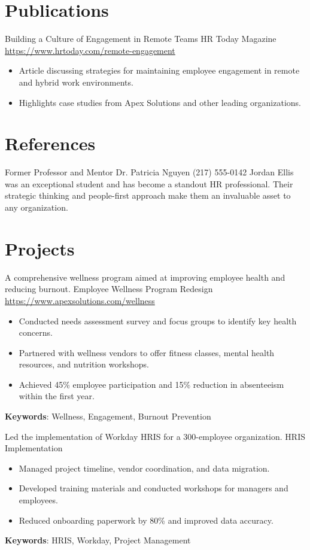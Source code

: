 \documentclass[a4paper, serif, 10pt]{moderncv}
\begin{document}
\section{Publications}

        {Building a Culture of Engagement in Remote Teams}
        {HR Today Magazine}
        {\url{https://www.hrtoday.com/remote-engagement}}
        {}
        {\begin{itemize}
\item Article discussing strategies for maintaining employee engagement in remote and hybrid work environments.
\item Highlights case studies from Apex Solutions and other leading organizations.
\end{itemize}}
\section{References}

        {Former Professor and Mentor}
        {Dr. Patricia Nguyen}
        {(217) 555-0142}
        {}
        {Jordan Ellis was an exceptional student and has become a standout HR professional. Their strategic thinking and people-first approach make them an invaluable asset to any organization.}
\section{Projects}

        {A comprehensive wellness program aimed at improving employee health and reducing burnout.}
        {Employee Wellness Program Redesign}
        {\url{https://www.apexsolutions.com/wellness}}
        {}
        {\begin{itemize}
\item Conducted needs assessment survey and focus groups to identify key health concerns.
\item Partnered with wellness vendors to offer fitness classes, mental health resources, and nutrition workshops.
\item Achieved 45\% employee participation and 15\% reduction in absenteeism within the first year.
\end{itemize}
\textbf{Keywords}: Wellness, Engagement, Burnout Prevention}

        {Led the implementation of Workday HRIS for a 300-employee organization.}
        {HRIS Implementation}
        {}
        {}
        {\begin{itemize}
\item Managed project timeline, vendor coordination, and data migration.
\item Developed training materials and conducted workshops for managers and employees.
\item Reduced onboarding paperwork by 80\% and improved data accuracy.
\end{itemize}
\textbf{Keywords}: HRIS, Workday, Project Management}
\end{document}
